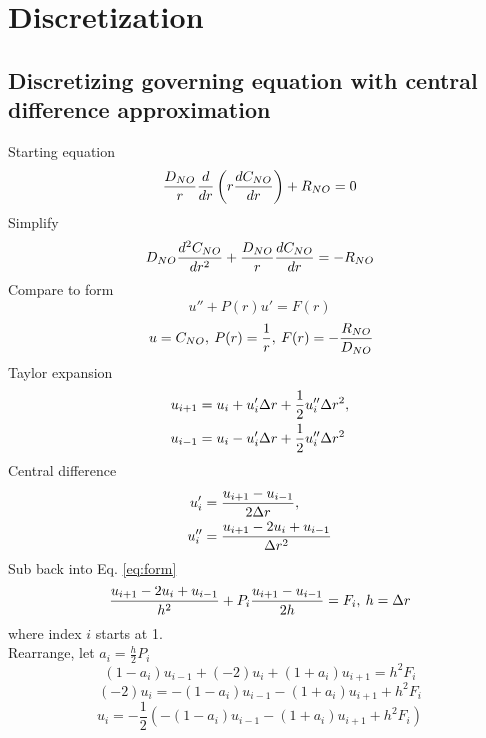 \section{Discretization}
\subsection{Discretizing governing equation with central difference 
approximation}
Starting equation
\begin{equation}
\frac{D_{NO}}{r} \frac{d}{dr} \left (r \frac{dC_{NO}}{dr} \right) + R_{NO} = 0
\end{equation}
Simplify
\begin{equation}
D_{NO} \frac{d^2C_{NO}}{dr^2} + \frac{D_{NO}}{r} \frac{dC_{NO}}{dr} = -R_{NO}
\end{equation}
Compare to form
\begin{equation} \label{eq:form}
u'' + P(r)u' = F(r)
\end{equation}
\begin{equation}
\:u = C_{NO}, \:P(r) = \frac{1}{r}, \:F(r) = -\frac{R_{NO}}{D_{NO}}
\end{equation}
Taylor expansion
\begin{align*}
u_{i + 1} &= u_i + u_i'\Delta r + \frac{1}{2}u_i''\Delta r^2,\\
u_{i - 1} &= u_i - u_i'\Delta r + \frac{1}{2}u_i''\Delta r^2
\end{align*}
Central difference
\begin{align*}
u_i' &= \frac{u_{i + 1} - u_{i - 1}}{2\Delta r},\\
u_i'' &= \frac{u_{i + 1} - 2u_i + u_{i - 1}}{\Delta r^2}
\end{align*}
Sub back into Eq. \eqref{eq:form}
\begin{equation}
\frac{u_{i + 1} - 2u_i + u_{i - 1}}{h^2} + P_i
\frac{u_{i + 1} - u_{i - 1}}{2h} = F_i, \:h = \Delta r
\end{equation}
where index $i$ starts at 1.\\
Rearrange, let $a_i = \frac{h}{2} P_i$
\begin{equation}
\left (1 - a_i \right)u_{i - 1} + (-2)u_i +
\left (1 + a_i \right)u_{i + 1} = h^2F_i
\end{equation}
\begin{equation}
(-2)u_i = -\left (1 - a_i \right)u_{i - 1} -
\left (1 + a_i \right)u_{i + 1} + h^2F_i
\end{equation}
\begin{equation}
u_i = -\frac{1}{2} \left (-\left (1 - a_i \right)u_{i - 1} - 
\left (1 + a_i \right)u_{i + 1} + h^2F_i \right)
\end{equation}


